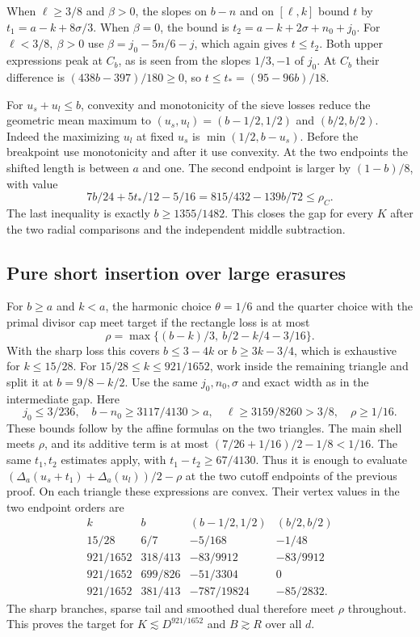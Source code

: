 When \(\ell\ge3/8\) and \(\beta>0\), the slopes on \(b-n\)
and on \([\ell,k]\) bound \(t\) by
\(t_1=a-k+8\sigma/3\).
When \(\beta=0\), the bound is
\(t_2=a-k+2\sigma+n_0+j_0\).
For \(\ell<3/8,\ \beta>0\) use
\(\beta=j_0-5n/6-j\), which again gives \(t\le t_2\).
Both upper expressions peak at \(C_b\), as is seen from
the slopes \(1/3,-1\) of \(j_0\).
At \(C_b\) their difference is
\((438b-397)/180\ge0\), so \(t\le t_*=(95-96b)/18\).

For \(u_s+u_l\le b\), convexity and monotonicity of the
sieve losses reduce the geometric mean maximum to
\((u_s,u_l)=(b-1/2,1/2)\) and \((b/2,b/2)\).
Indeed the maximizing \(u_l\) at fixed \(u_s\) is
\(\min(1/2,b-u_s)\). Before the breakpoint use monotonicity
and after it use convexity. At the two endpoints the shifted
length is between \(a\) and one. The second endpoint is larger
by \((1-b)/8\), with value
\[
 7b/24+5t_*/12-5/16=815/432-139b/72\le\rho_C .
\]
The last inequality is exactly \(b\ge1355/1482\).
This closes the gap for every \(K\) after the two radial
comparisons and the independent middle subtraction.

\subsection{Pure short insertion over large erasures}
\label{pca:detail-short}

For \(b\ge a\) and \(k<a\), the harmonic choice \(\theta=1/6\)
and the quarter choice with the primal divisor cap meet target
if the rectangle loss is at most
\[
 \rho=\max\{(b-k)/3,\ b/2-k/4-3/16\}.
\]
With the sharp loss this covers \(b\le3-4k\) or
\(b\ge3k-3/4\), which is exhaustive for \(k\le15/28\).
For \(15/28\le k\le921/1652\), work inside the remaining
triangle and split it at \(b=9/8-k/2\).
Use the same \(j_0,n_0,\sigma\) and exact width as in the
intermediate gap. Here
\[
 j_0\le3/236,\quad b-n_0\ge3117/4130>a,\quad
 \ell\ge3159/8260>3/8,\quad \rho\ge1/16.
\]
These bounds follow by the affine formulas on the two triangles.
The main shell meets \(\rho\), and its additive term is at most
\((7/26+1/16)/2-1/8<1/16\).
The same \(t_1,t_2\) estimates apply, with
\(t_1-t_2\ge67/4130\). Thus it is enough to evaluate
\((\Delta_a(u_s+t_1)+\Delta_a(u_l))/2-\rho\)
at the two cutoff endpoints of the previous proof.
On each triangle these expressions are convex. Their
vertex values in the two endpoint orders are
\[
 \begin{array}{c|c|rr}
 k&b & (b-1/2,1/2)&(b/2,b/2)\\ \hline
 15/28&6/7&-5/168&-1/48\\
 921/1652&318/413&-83/9912&-83/9912\\
 921/1652&699/826&-51/3304&0\\
 921/1652&381/413&-787/19824&-85/2832 .
 \end{array}
\]
The sharp branches, sparse tail and smoothed dual therefore
meet \(\rho\) throughout. This proves the target for
\(K\lesssim D^{921/1652}\) and \(B\gtrsim R\) over all \(d\).

